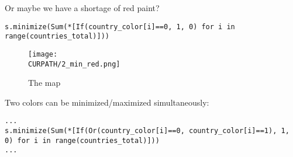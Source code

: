 

Or maybe we have a shortage of red paint?

\begin{lstlisting}
s.minimize(Sum(*[If(country_color[i]==0, 1, 0) for i in range(countries_total)]))
\end{lstlisting}

\begin{figure}[H]
\centering
\texttt{[image: \\CURPATH/2\_min\_red.png]}
\caption{The map}
\end{figure}



Two colors can be minimized/maximized simultaneously:

\begin{lstlisting}
...
s.minimize(Sum(*[If(Or(country_color[i]==0, country_color[i]==1), 1, 0) for i in range(countries_total)]))
...
\end{lstlisting}

